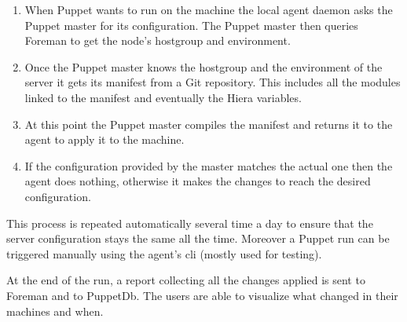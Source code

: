 \begin{enumerate}

\item When Puppet wants to run on the machine the local agent daemon asks
the Puppet master for its configuration. The Puppet master then queries
Foreman to get the node's hostgroup and environment.

\item Once the Puppet master knows the hostgroup and the environment of
the server it gets its manifest from a Git repository. This includes all
the modules linked to the manifest and eventually the Hiera variables.

\item At this point the Puppet master compiles the manifest and returns it
to the agent to apply it to the machine.

\item If the configuration provided by the master matches the actual one
then the agent does nothing, otherwise it makes the changes to reach the
desired configuration.

\end{enumerate}

This process is repeated automatically several time a day to ensure that
the server configuration stays the same all the time. Moreover a Puppet
run can be triggered manually using the agent's cli (mostly used for
testing).

At the end of the run, a report collecting all the changes applied is sent
to Foreman and to PuppetDb. The users are able to visualize what changed
in their machines and when.
